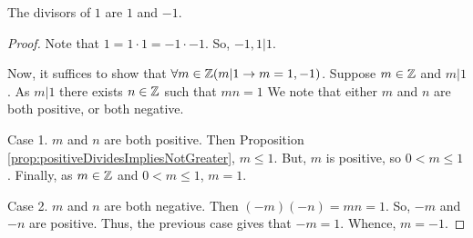 \guard





\begin{prop}
\label{prop:divisorsOf1}
  The divisors of $1$ are $1$ and $-1$.
\end{prop}
\begin{proof}
  Note that $1=1\cdot 1=-1\cdot-1$.
  So, $-1,1\vert 1$.

  Now, it suffices to show that $\forall m\in\mathbb{Z}( m\vert 1\rightarrow m=1,-1)$.
  Suppose $m\in\mathbb{Z}$ and $m\vert 1$.
  As $m\vert 1$ there exists $n\in\mathbb{Z}$ such that $mn=1$
  We note that either $m$ and $n$ are both positive, or both negative.


  Case 1. $m$ and $n$ are both positive.
    Then Proposition \ref{prop:positiveDividesImpliesNotGreater}, $m\leq 1$.
    But, $m$ is positive, so $0<m\leq 1$.
    Finally, as $m\in\mathbb{Z}$ and $0<m\leq 1$, $m=1$.


  Case 2. $m$ and $n$ are both negative.
    Then $(-m)(-n)=mn=1$.
    So, $-m$ and $-n$ are positive.
    Thus, the previous case gives that $-m=1$.
    Whence, $m=-1$.
\end{proof}
